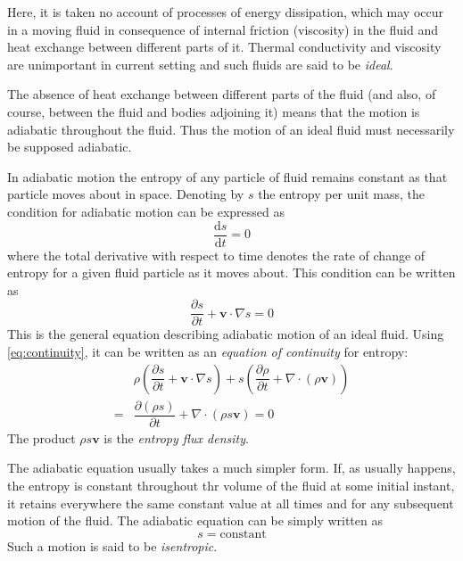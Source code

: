 \documentclass[conference]{IEEEtran}
\theoremstyle{definition}
\theoremstyle{remark}
\begin{document}
    Here, it is taken no account of processes of energy dissipation, which may occur in a moving fluid in consequence of internal friction (viscosity) in the fluid and heat exchange between different parts of it. Thermal conductivity and viscosity are unimportant in current setting and such fluids are said to be \emph{ideal}.

    The absence of heat exchange between different parts of the fluid (and also, of course, between the fluid and bodies adjoining it) means that the motion is adiabatic throughout the fluid. Thus the motion of an ideal fluid must necessarily be supposed adiabatic.

    In adiabatic motion the entropy of any particle of fluid remains constant as that particle moves about in space. Denoting by $s$ the entropy per unit mass, the condition for adiabatic motion can be  expressed as
    \begin{equation}
        \dfrac{\mathrm{d} s}{\mathrm{d} t} = 0
    \end{equation}
    where the total derivative with respect to time denotes the rate of change of entropy for a given fluid particle as it moves about. This condition can be written as
    \begin{equation}
        \dfrac{\partial s}{\partial t} + \mathbf{v} \cdot \nabla s = 0
        \label{eq:general_adiabatic}
    \end{equation}
    This is the general equation describing adiabatic motion of an ideal fluid. Using \ref{eq:continuity}, it can be written as an \emph{equation of continuity} for entropy:
    \begin{align}
        & \rho \left(\dfrac{\partial s}{\partial t} + \mathbf{v} \cdot \nabla s \right) + s \left(\dfrac{\partial \rho}{\partial t} + \nabla \cdot (\rho \mathbf{v}) \right) \nonumber \\
        =& \dfrac{\partial (\rho s)}{\partial t} + \nabla \cdot (\rho s \mathbf{v}) = 0
    \end{align}
    The product $\rho s \mathbf{v}$ is the \emph{entropy flux density}.

    The adiabatic equation usually takes a much simpler form. If, as usually happens, the entropy is constant throughout thr volume of the fluid at some initial instant, it retains everywhere the same constant value at all times and for any subsequent motion of the fluid. The adiabatic equation can be simply written as
    \begin{equation}
        s = \text{constant}
    \end{equation}
    Such a motion is said to be \emph{isentropic}.
\end{document}
